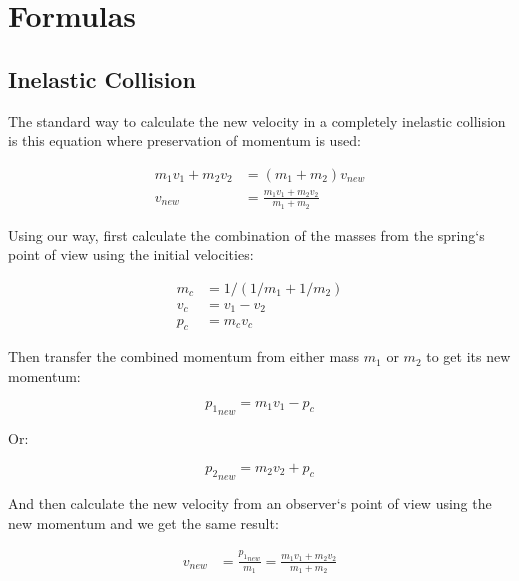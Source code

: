 \documentclass[]{elementary-physics}
\begin{document}
\section{Formulas}

\subsection{Inelastic Collision}

The standard way to calculate the new velocity in a completely inelastic collision is this equation where preservation of momentum is used:

\begin{subequations}
\begin{align}
m_1 v_1 + m_2 v_2 &= (m_1 + m_2)v_{new} \\
v_{new} &= \frac{m_1 v_1 + m_2 v_2}{m_1 + m_2}
\end{align}
\end{subequations}

Using our way, first calculate the combination of the masses from the spring`s point of view using the initial velocities:

\begin{subequations}
\begin{align}
m_c &= 1/(1/m_1 + 1/m_2) \\
v_c &= v_1 - v_2 \\
p_c &= m_c v_c
\end{align}
\end{subequations}

Then transfer the combined momentum from either mass $m_1$ or $m_2$ to get its new momentum:

\begin{equation}
{p_1}_{new} = m_1 v_1 - p_c
\end{equation}

Or:

\begin{equation}
{p_2}_{new} = m_2 v_2 + p_c
\end{equation}

And then calculate the new velocity from an observer`s point of view using the new momentum and we get the same result:

\begin{subequations}
\begin{align}
{v}_{new} &= \frac{{p_1}_{new}}{m_1} = \frac{m_1 v_1 + m_2 v_2}{m_1 + m_2}
\end{align}
\end{subequations}
\end{document}
